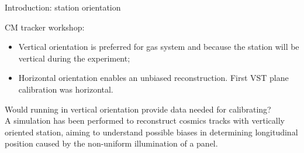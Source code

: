 \documentclass{beamer}[10pt]
\begin{document}
\begin{frame}{Introduction: station orientation}
  
  CM tracker workshop:
  \vspace{1mm}
  \begin{itemize}
    \item Vertical orientation is preferred for gas system and because the station will be vertical during the experiment;
    \vspace{1mm}
  \item Horizontal orientation enables an unbiased reconstruction. First VST plane calibration was horizontal.
\end{itemize}
\vspace{3mm}
Would running in vertical orientation provide data needed for calibrating?
\vspace{3mm}
\\
A simulation has been performed to reconstruct cosmics tracks with vertically oriented station,
  aiming to understand possible biases in determining longitudinal position caused by the non-uniform illumination of a panel.
\end{frame}
\end{document}
